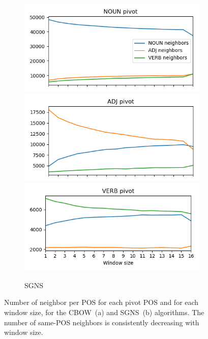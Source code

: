 \documentclass[11pt,a4paper]{article}
\begin{document}
\begin{figure}[t]
\begin{subfigure}[b]{.475\textwidth}
        \includegraphics[width=\textwidth]{NOUN_nn_100_fasttext_enwiki-20170501-clean_skipgram-300d-min500_pos.png}
        \includegraphics[width=\textwidth]{ADJ_nn_100_fasttext_enwiki-20170501-clean_skipgram-300d-min500_pos.png}
        \includegraphics[width=\textwidth]{VERB_nn_100_fasttext_enwiki-20170501-clean_skipgram-300d-min500_pos.png}
        \caption{SGNS}
        \end{subfigure}
        \caption{Number of neighbor per POS for each pivot POS and for each window size,
        for the CBOW~(a) and SGNS~(b) algorithms.
        The number of same-POS neighbors is consistently decreasing with window size.\label{fig:nn_pos_hist}}
    \end{figure}
    
\end{document}
